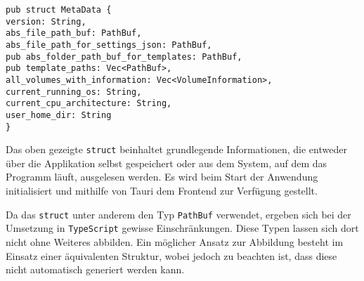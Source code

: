 \newpage

\begin{verbatim}
pub struct MetaData {
version: String,
abs_file_path_buf: PathBuf,
abs_file_path_for_settings_json: PathBuf,
pub abs_folder_path_buf_for_templates: PathBuf,
pub template_paths: Vec<PathBuf>,
all_volumes_with_information: Vec<VolumeInformation>,
current_running_os: String,
current_cpu_architecture: String,
user_home_dir: String
}
\end{verbatim}

Das oben gezeigte \verb|struct| beinhaltet grundlegende Informationen, die entweder über die Applikation selbst gespeichert oder
aus dem System, auf dem das Programm läuft, ausgelesen werden. Es wird beim Start der Anwendung initialisiert und mithilfe von
Tauri dem Frontend zur Verfügung gestellt.

Da das \verb|struct| unter anderem den Typ \verb|PathBuf| verwendet, ergeben sich bei der Umsetzung in \verb|TypeScript| gewisse
Einschränkungen. Diese Typen lassen sich dort nicht ohne Weiteres abbilden. Ein möglicher Ansatz zur Abbildung besteht im Einsatz
einer äquivalenten Struktur, wobei jedoch zu beachten ist, dass diese nicht automatisch generiert werden kann.

